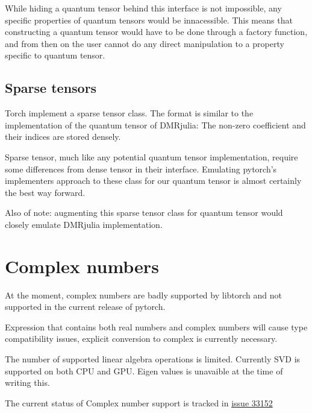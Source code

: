 \documentclass[15pt]{article}
\begin{document}
While hiding a quantum tensor behind this interface is not impossible, any specific properties of quantum tensors would be innacessible. This means that constructing a quantum tensor would have to be done through a factory function, and from then on the user cannot do any direct manipulation to a property specific to quantum tensor.

\subsection{Sparse tensors}
Torch implement a sparse tensor class. The format is similar to the implementation of the quantum tensor of DMRjulia: The non-zero coefficient and their indices are stored densely.

Sparse tensor, much like any potential quantum tensor implementation, require some differences from dense tensor in their interface. Emulating pytorch's implementers approach to these class for our quantum tensor is almost certainly the best way forward.

Also of note: augmenting this sparse tensor class for quantum tensor would closely emulate DMRjulia implementation.

\section{Complex numbers}
At the moment, complex numbers are badly supported by libtorch and not supported in the current release of pytorch.

Expression that contains both real numbers and complex numbers will cause type compatibility issues, explicit conversion to complex is currently necessary.

The number of supported linear algebra operations is limited. Currently SVD is supported on both CPU and GPU.
Eigen values is unavaible at the time of writing this.

The current status of Complex number support is tracked in \href{https://github.com/pytorch/pytorch/issues/33152}{issue 33152}
\end{document}
